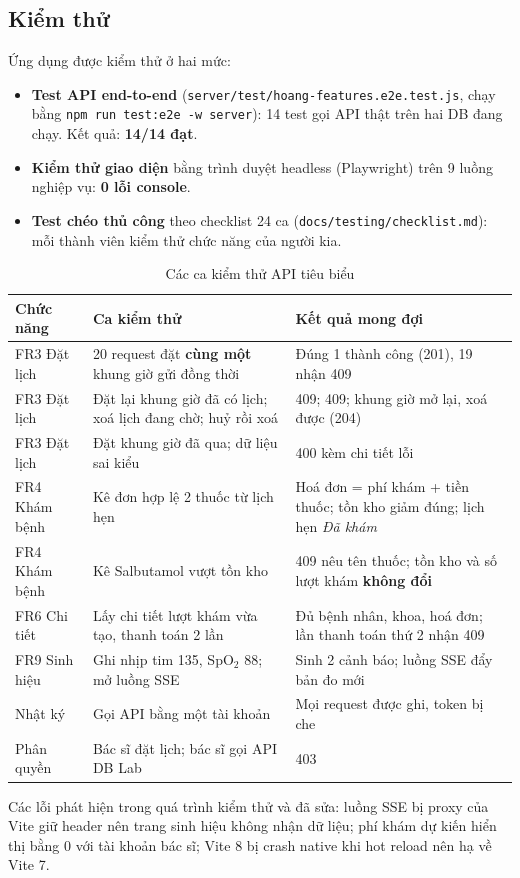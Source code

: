 \subsection{Kiểm thử}
Ứng dụng được kiểm thử ở hai mức:
\begin{itemize}
    \item \textbf{Test API end-to-end} (\texttt{server/test/hoang-features.e2e.test.js}, chạy bằng \texttt{npm run test:e2e -w server}): 14 test gọi API thật trên hai DB đang chạy. Kết quả: \textbf{14/14 đạt}.
    \item \textbf{Kiểm thử giao diện} bằng trình duyệt headless (Playwright) trên 9 luồng nghiệp vụ: \textbf{0 lỗi console}.
    \item \textbf{Test chéo thủ công} theo checklist 24 ca (\texttt{docs/testing/checklist.md}): mỗi thành viên kiểm thử chức năng của người kia.
\end{itemize}

\begin{table}[H]
\centering
\caption{Các ca kiểm thử API tiêu biểu}
\label{tab:e2e}
\begin{tabularx}{\linewidth}{|p{3cm}|X|X|}
\hline
\textbf{Chức năng} & \textbf{Ca kiểm thử} & \textbf{Kết quả mong đợi} \\ \hline
FR3 Đặt lịch & 20 request đặt \textbf{cùng một} khung giờ gửi đồng thời & Đúng 1 thành công (201), 19 nhận 409 \\ \hline
FR3 Đặt lịch & Đặt lại khung giờ đã có lịch; xoá lịch đang chờ; huỷ rồi xoá & 409; 409; khung giờ mở lại, xoá được (204) \\ \hline
FR3 Đặt lịch & Đặt khung giờ đã qua; dữ liệu sai kiểu & 400 kèm chi tiết lỗi \\ \hline
FR4 Khám bệnh & Kê đơn hợp lệ 2 thuốc từ lịch hẹn & Hoá đơn = phí khám + tiền thuốc; tồn kho giảm đúng; lịch hẹn \textit{Đã khám} \\ \hline
FR4 Khám bệnh & Kê Salbutamol vượt tồn kho & 409 nêu tên thuốc; tồn kho và số lượt khám \textbf{không đổi} \\ \hline
FR6 Chi tiết & Lấy chi tiết lượt khám vừa tạo, thanh toán 2 lần & Đủ bệnh nhân, khoa, hoá đơn; lần thanh toán thứ 2 nhận 409 \\ \hline
FR9 Sinh hiệu & Ghi nhịp tim 135, SpO$_2$ 88; mở luồng SSE & Sinh 2 cảnh báo; luồng SSE đẩy bản đo mới \\ \hline
Nhật ký & Gọi API bằng một tài khoản & Mọi request được ghi, token bị che \\ \hline
Phân quyền & Bác sĩ đặt lịch; bác sĩ gọi API DB Lab & 403 \\ \hline
\end{tabularx}
\end{table}

Các lỗi phát hiện trong quá trình kiểm thử và đã sửa: luồng SSE bị proxy của Vite giữ header nên trang sinh hiệu không nhận dữ liệu; phí khám dự kiến hiển thị bằng 0 với tài khoản bác sĩ; Vite 8 bị crash native khi hot reload nên hạ về Vite 7.
